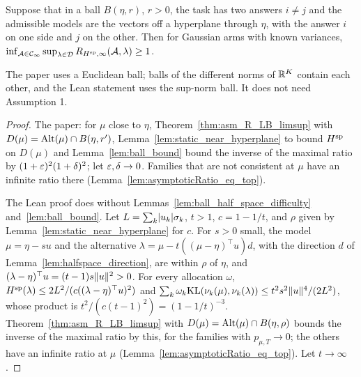 \begin{theorem}[{\cite[Theorem 7]{D23}}]
  \label{thm:flat_boundary}
  \leanok
  Suppose that in a ball $B(\eta, r)$, $r > 0$, the task has two answers $i \ne j$ and the
  admissible models are the vectors off a hyperplane through $\eta$, with the answer $i$ on one
  side and $j$ on the other. Then for Gaussian arms with known variances,
  $\inf_{\mathcal{A} \in \mathcal{C}_{\infty}} \sup_{\lambda \in \mathcal{D}} R_{H^{\mathrm{sp}}, \infty}(\mathcal{A}, \lambda) \ge 1$.
\end{theorem}

The paper uses a Euclidean ball; balls of the different norms of $\mathbb{R}^K$ contain each other, and
the Lean statement uses the sup-norm ball. It does not need Assumption 1.

\begin{proof}
  \leanok
  The paper: for $\mu$ close to $\eta$, Theorem~\ref{thm:asm_R_LB_limsup} with $D(\mu) = \mathrm{Alt}(\mu)
  \cap B(\eta, r')$, Lemma~\ref{lem:static_near_hyperplane} to bound $H^{\mathrm{sp}}$ on $D(\mu)$ and
  Lemma~\ref{lem:ball_bound} bound the inverse of the maximal ratio by $(1 + \varepsilon)^2 (1 +
  \delta)^2$; let $\varepsilon, \delta \to 0$. Families that are not consistent at $\mu$ have an infinite
  ratio there (Lemma~\ref{lem:asymptoticRatio_eq_top}).

  The Lean proof does without Lemmas~\ref{lem:ball_half_space_difficulty}
  and~\ref{lem:ball_bound}. Let $L = \sum_k \lvert u_k \rvert \sigma_k$, $t > 1$, $c = 1 - 1/t$, and $\rho$
  given by Lemma~\ref{lem:static_near_hyperplane} for $c$. For $s > 0$ small, the model $\mu = \eta -
  s u$ and the alternative $\lambda = \mu - t ((\mu - \eta)^{\top} u) d$, with the direction $d$ of
  Lemma~\ref{lem:halfspace_direction}, are within $\rho$ of $\eta$, and $(\lambda - \eta)^{\top} u =
  (t - 1) s \lVert u \rVert^2 > 0$. For every allocation $\omega$, $H^{\mathrm{sp}}(\lambda) \le 2 L^2 / (c ((\lambda -
  \eta)^{\top} u)^2)$ and $\sum_k \omega_k \mathrm{KL}(\nu_k(\mu), \nu_k(\lambda)) \le t^2 s^2 \lVert u \rVert^4 / (2
  L^2)$, whose product is $t^2 / (c (t - 1)^2) = (1 - 1/t)^{-3}$. Theorem~\ref{thm:asm_R_LB_limsup}
  with $D(\mu) = \mathrm{Alt}(\mu) \cap B(\eta, \rho)$ bounds the inverse of the maximal ratio by this, for
  the families with $p_{\mu, T} \to 0$; the others have an infinite ratio at $\mu$
  (Lemma~\ref{lem:asymptoticRatio_eq_top}). Let $t \to \infty$.
\end{proof}

